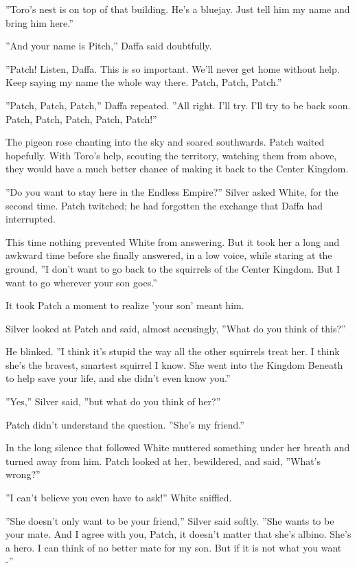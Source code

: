 \documentclass[12pt]{book}
\begin{document}
''Toro's nest is on top of that building. He's a bluejay. Just tell him my name and bring him here.''

''And your name is Pitch,'' Daffa said doubtfully.

''Patch! Listen, Daffa. This is so important. We'll never get home without help. Keep saying my name the whole way there. Patch, Patch, Patch.''

''Patch, Patch, Patch,'' Daffa repeated. ''All right. I'll try. I'll try to be back soon. Patch, Patch, Patch, Patch, Patch!''

The pigeon rose chanting into the sky and soared southwards. Patch waited hopefully. With Toro's help, scouting the territory, watching them from above, they would have a much better chance of making it back to the Center Kingdom.

''Do you want to stay here in the Endless Empire?'' Silver asked White, for the second time. Patch twitched; he had forgotten the exchange that Daffa had interrupted.

This time nothing prevented White from answering. But it took her a long and awkward time before she finally answered, in a low voice, while staring at the ground, ''I don't want to go back to the squirrels of the Center Kingdom. But I want to go wherever your son goes.''

It took Patch a moment to realize 'your son' meant him.

Silver looked at Patch and said, almost accusingly, ''What do you think of this?''

He blinked. ''I think it's stupid the way all the other squirrels treat her. I think she's the bravest, smartest squirrel I know. She went into the Kingdom Beneath to help save your life, and she didn't even know you.''

''Yes,'' Silver said, ''but what do you think of her?''

Patch didn't understand the question. ''She's my friend.''

In the long silence that followed White muttered something under her breath and turned away from him. Patch looked at her, bewildered, and said, ''What's wrong?''

''I can't believe you even have to ask!'' White sniffled.

''She doesn't only want to be your friend,'' Silver said softly. ''She wants to be your mate. And I agree with you, Patch, it doesn't matter that she's albino. She's a hero. I can think of no better mate for my son. But if it is not what you want -''
\end{document}
